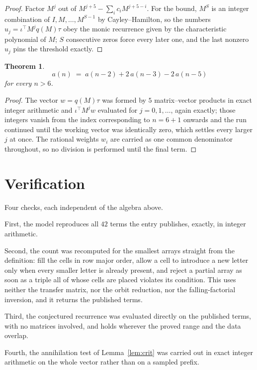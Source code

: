\documentclass[11pt,a4paper]{article}
\theoremstyle{plain}
\newtheorem{theorem}{Theorem}
\theoremstyle{definition}
\begin{document}
\begin{proof}
Factor $M^{j}$ out of $M^{j+5}-\sum_ic_iM^{j+5-i}$. For the bound, $M^{S}$
is an integer combination of $I,M,\dots,M^{S-1}$ by Cayley--Hamilton, so the numbers
$u_j=\iota^{\!\top}M^{j}q(M)\tau$ obey the monic recurrence given by the characteristic
polynomial of $M$; $S$ consecutive zeros force every later one, and the last nonzero $u_j$
pins the threshold exactly.
\end{proof}

\begin{theorem}
\[
a(n)\;=\;a(n-2) + 2\,a(n-3) - 2\,a(n-5)
\]
for every $n>6$.
\end{theorem}

\begin{proof}
The vector $w=q(M)\tau$ was formed by $5$ matrix--vector products in exact integer
arithmetic and $\iota^{\!\top}M^{j}w$ evaluated for $j=0,1,\dots$, again exactly; those
integers vanish from the index corresponding to $n=6+1$ onwards and the run continued
until the working vector was identically zero, which settles every larger $j$ at once. The
rational weights $w_i$ are carried as one common denominator throughout, so no division is
performed until the final term.
\end{proof}

\section{Verification}

Four checks, each independent of the algebra above.

First, the model reproduces all $42$ terms the entry publishes, exactly, in integer
arithmetic.

Second, the count was recomputed for the smallest arrays straight from the definition: fill the
cells in row major order, allow a cell to introduce a new letter only when every smaller letter
is already present, and reject a partial array as soon as a triple all of whose cells are
placed violates its condition. This uses neither the transfer matrix, nor the orbit reduction,
nor the falling-factorial inversion, and it returns the published terms.

Third, the conjectured recurrence was evaluated directly on the published terms, with no
matrices involved, and holds wherever the proved range and the data overlap.

Fourth, the annihilation test of Lemma~\ref{lem:crit} was carried out in exact integer
arithmetic on the whole vector rather than on a sampled prefix.
\end{document}
